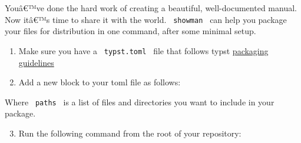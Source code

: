 \begin{Shaded}
\begin{Highlighting}[]


\NormalTok{\textasciigrave{}\textasciigrave{}\textasciigrave{}}

\end{Highlighting}
\end{Shaded}

Youâ€™ve done the hard work of creating a beautiful, well-documented
manual. Now itâ€™s time to share it with the world. \texttt{\ showman\ }
can help you package your files for distribution in one command, after
some minimal setup.

\begin{enumerate}
\item
  Make sure you have a \texttt{\ typst.toml\ } file that follows typst
  \href{https://github.com/typst/packages}{packaging guidelines}
\item
  Add a new block to your toml file as follows:
\end{enumerate}

\begin{Shaded}
\begin{Highlighting}[]
 \OperatorTok{=} \OperatorTok{[}\OperatorTok{]}
\end{Highlighting}
\end{Shaded}

Where \texttt{\ paths\ } is a list of files and directories you want to
include in your package.

\begin{enumerate}
\setcounter{enumi}{2}
\tightlist
\item
  Run the following command from the root of your repository:
\end{enumerate}

\begin{Shaded}
\begin{Highlighting}[]
\end{Highlighting}
\end{Shaded}

